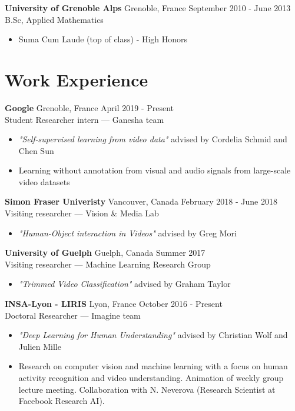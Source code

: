 \documentclass[10pt]{res} %
\begin{document}
\begin{resume}
\textbf{University of Grenoble Alps} \hfill Grenoble, France \hfill September 2010 - June 2013 \\
B.Sc, Applied Mathematics
\begin{itemize}
\item Suma Cum Laude (top of class) - High Honors
\end{itemize}
 

\section{\large Work Experience} 

\textbf{Google} \hfill Grenoble, France \hfill April 2019 - Present \\
Student Researcher intern --- Ganesha team
\begin{itemize}
\item \textit{"Self-supervised learning from video data"} advised by Cordelia Schmid and Chen Sun
\item Learning without annotation from visual and audio signals from large-scale video datasets
\end{itemize}

\textbf{Simon Fraser Univeristy} \hfill Vancouver, Canada \hfill February 2018 - June 2018 \\
Visiting researcher --- Vision \& Media Lab
\begin{itemize}
\item \textit{"Human-Object interaction in Videos"} advised by Greg Mori
\end{itemize}

\textbf{University of Guelph} \hfill Guelph, Canada \hfill Summer 2017 \\
Visiting researcher --- Machine Learning Research Group
\begin{itemize}
\item \textit{"Trimmed Video Classification"} advised by Graham Taylor
\end{itemize}

\textbf{INSA-Lyon - LIRIS} \hfill Lyon, France \hfill October 2016 - Present \\
Doctoral Researcher --- Imagine team
\begin{itemize}
\item \textit{"Deep Learning for Human Understanding"} advised by Christian Wolf and Julien Mille
\item Research on computer vision and machine learning with a focus on human activity recognition and video understanding. Animation of weekly group lecture meeting. Collaboration with N. Neverova (Research Scientist at Facebook Research AI).
\end{itemize}


\end{resume}
\end{document}
